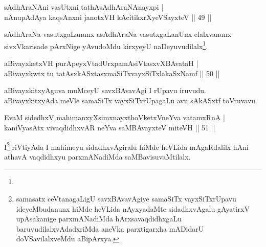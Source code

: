 
\begin{shl}
sAdhAraNAni vasUtxni tathA\s sAdhAraNAnayxpi | \\
nAnupAdAya kaqsAnxni janotxVH kAcitikxrXyeVSayxteV \hfill ||  49 || 
\end{shl}

\begin{artha} 
sAdhAraNa vasutxgaLanunx asAdhAraNa vasutxgaLanUnx elalxvanunx 
sivxVkarisade pArxNige yAvudoMdu kirxyeyU naDeyuvudilalx\footnote[1]{}.
\end{artha}


\begin{shl}
\footnotemark[1]{}aBivayxketxVH purA\s peyxVtadUrxpamAsiVtasxvXBAvataH | \\
aBivayxkwtx tu tatAsxkASxtasxmaSiTxvayxSiTxlakaSxNamf \hfill ||  50 || 
\end{shl}

\begin{artha} 
aBivayxkitxyAguva muMceyU savxBAvavAgi I rUpavu iruvudu. 
aBivayxkitxyAda meVle samaSiTx vayxSiTxrUpagaLu avu sAkASxtf 
toVruvavu.
\end{artha}

\begin{shl}
EvaM sidedhxV mahimanxyXsimxnayxthoVketxVneYva vatamxRnA | \\
kaniVyasAtx vivaqdidhxvAR neYva saMBAvayxteV miteVH \hfill ||  51 || 
\end{shl}

\begin{artha} 
I\footnote[1]{samasatx ceVtanagaLigU savxBAvavAgiye samaSiTx 
vayxSiTxrUpavu ideyeMbudanunx hiMde heVLida nAyxyadaMte sidadhxvAgalu 
gAyatirxV upAsakanige parxmANadiMda hArxsavaqdidhxgaLu 
baruvudilalxvAdadxriMda aneVka parxtigarxha mADidarU doVSavilalxveMdu 
aBipArxya.} riVtiyAda I mahimeyu sidadhxvAgiralu hiMde heVLida 
mAgaRdalilx hAni athavA vaqdidhxyu parxmANadiMda saMBavisuvaMtilalx.
\end{artha}

